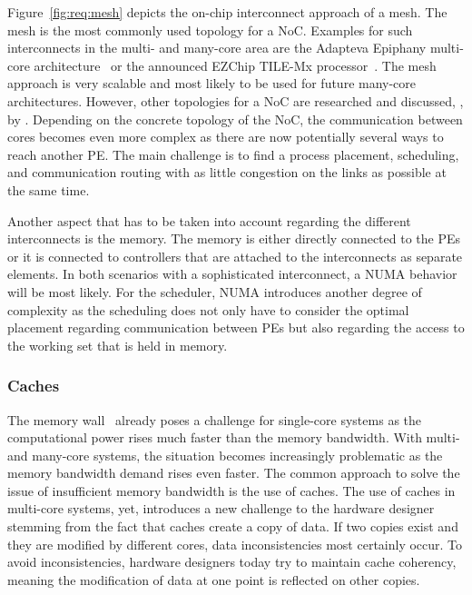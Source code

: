 Figure~\ref{fig:req:mesh} depicts the on-chip interconnect approach of a mesh. The mesh is the most commonly used topology for a \ac{NoC}. Examples for such interconnects in the multi- and many-core area are the Adapteva Epiphany multi-core architecture~\cite{Adapteva-2013-Epiphany} or the announced EZChip TILE-Mx processor~\cite{Doud-2015-TILE-Mx}. The mesh approach is very scalable and most likely to be used for future many-core architectures. However, other topologies for a \ac{NoC} are researched and discussed, \eg, by \textcite{Sewell-2012-SwizlleSwitch}. Depending on the concrete topology of the \ac{NoC}, the communication between cores becomes even more complex as there are now potentially several ways to reach another \ac{PE}. The main challenge is to find a process placement, scheduling, and communication routing with as little congestion on the links as possible at the same time.

Another aspect that has to be taken into account regarding the different interconnects is the memory. The memory is either directly connected to the \acp{PE} or it is connected to controllers that are attached to the interconnects as separate elements. In both scenarios with a sophisticated interconnect, a \ac{NUMA} behavior will be most likely. For the scheduler, \ac{NUMA} introduces another degree of complexity as the scheduling does not only have to consider the optimal placement regarding communication between \acp{PE} but also regarding the access to the working set that is held in memory.

\subsubsection{Caches}

The memory wall~\cite{Wulf-1995-MemoryWall} already poses a challenge for single-core systems as the computational power rises much faster than the memory bandwidth. With multi- and many-core systems, the situation becomes increasingly problematic as the memory bandwidth demand rises even faster. The common approach to solve the issue of insufficient memory bandwidth is the use of caches. The use of caches in multi-core systems, yet, introduces a new challenge to the hardware designer stemming from the fact that caches create a copy of data. If two copies exist and they are modified by different cores, data inconsistencies most certainly occur. To avoid inconsistencies, hardware designers today try to maintain cache coherency, meaning the modification of data at one point is reflected on other copies.

